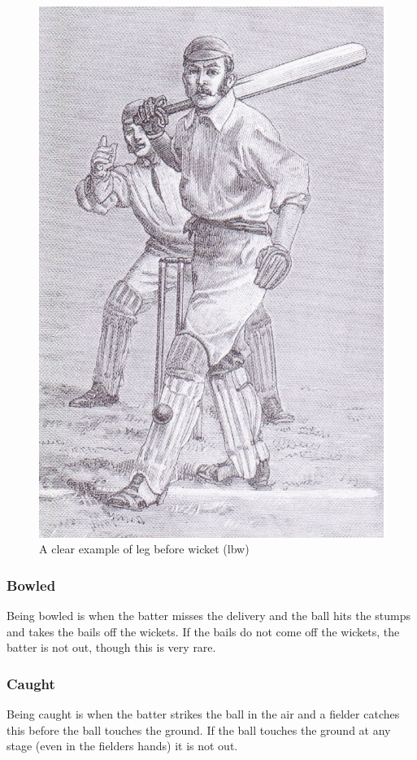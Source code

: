 \documentclass[12pt,a4paper]{report}
\theoremstyle{definition}
\begin{document}
\begin{figure}[H]
    \centering
    \includegraphics[width=0.8\linewidth]{Leg_before_wicket.jpg}
    \caption{A clear example of leg before wicket (lbw) \citep{lbwWiki}}
    \label{fig:lbw}
\end{figure}

\subsubsection{Bowled}

Being bowled is when the batter misses the delivery and the ball hits the stumps and takes the bails off the wickets.
If the bails do not come off the wickets, the batter is not out, though this is very rare.

\subsubsection{Caught}

Being caught is when the batter strikes the ball in the air and a fielder catches this before the ball touches the ground.
If the ball touches the ground at any stage (even in the fielders hands) it is not out.
\end{document}
